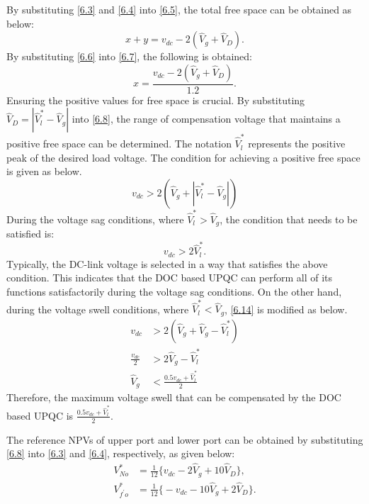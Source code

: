 By substituting \eqref{6.3} and \eqref{6.4} into \eqref{6.5}, the total free space can be obtained as below:
\begin{equation} \label{6.7}
x + y = v_{dc} - 2(\hat{V}_{g} + \hat{V}_{D}).
\end{equation}
By substituting \eqref{6.6} into \eqref{6.7}, the following is obtained:
\begin{equation} \label{6.8}
x = \frac{v_{dc} - 2(\hat{V}_{g} + \hat{V}_{D})}{1.2}.
\end{equation} 
Ensuring the positive values for free space is crucial. By substituting $ \hat{V}_{D} = | \hat{V}^*_{l} -  \hat{V}_{g}|$ into \eqref{6.8}, the range of compensation voltage that maintains a positive free space can be determined. The notation $\hat{V}^*_{l}$ represents the positive peak of the desired load voltage. The condition for achieving a positive free space is given as below.
\begin{equation} \label{6.14}
v_{dc} > 2(\hat{V}_{g} + | \hat{V}^*_{l} -  \hat{V}_{g}|)
\end{equation} 
During the voltage sag conditions, where $\hat{V}^*_{l} > \hat{V}_{g}$, the condition that needs to be satisfied is:
\begin{equation} \label{6.15}
v_{dc} > 2 \hat{V}^*_{l}.
\end{equation} 
Typically, the DC-link voltage is selected in a way that satisfies the above condition. This indicates that the DOC based UPQC can perform all of its functions satisfactorily during the voltage sag conditions. On the other hand, during the voltage swell conditions, where $\hat{V}^*_{l} < \hat{V}_{g}$, \eqref{6.14} is modified as below.
\begin{equation} \label{6.16}
\begin{aligned}
v_{dc} &> 2(\hat{V}_{g} + \hat{V}_{g} - \hat{V}^*_{l} ) \\
\frac{v_{dc}}{2} &> 2 \hat{V}_{g} - \hat{V}^*_{l} \\
\hat{V}_{g} &< \frac{0.5v_{dc} + \hat{V}^*_{l}}{2}
\end{aligned}
\end{equation} 
Therefore, the maximum voltage swell that can be compensated by the DOC based UPQC is $\frac{0.5v_{dc} + \hat{V}^*_{l}}{2}$.

The reference NPVs of upper port and lower port can be obtained by substituting \eqref{6.8} into \eqref{6.3} and \eqref{6.4}, respectively, as given below:
\begin{equation} \label{6.9}
\begin{aligned}
V^{*}_{No} &= \frac{1}{12}\Big\{ v_{dc} - 2\hat{V}_{g} + 10\hat{V}_{D} \Big\}, \\
V^{*}_{f^{\prime}o} &= \frac{1}{12}\Big\{ -v_{dc} - 10\hat{V}_{g} + 2\hat{V}_{D} \Big\}.
\end{aligned}
\end{equation}  

